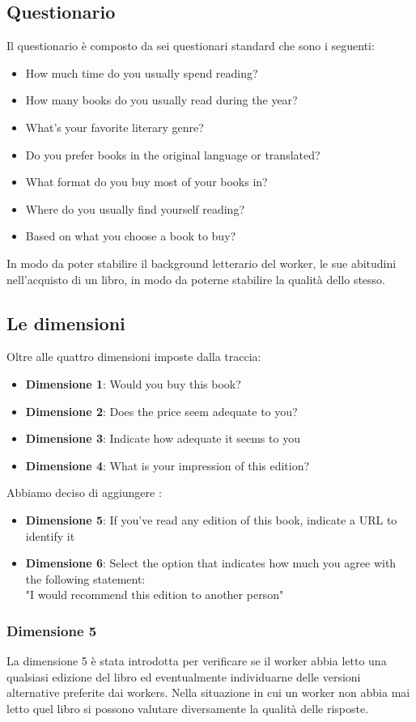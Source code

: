 \documentclass[a4paper,11pt]{report}
\begin{document}
\subsection{Questionario}
Il questionario è composto da sei questionari standard che sono i seguenti:
\begin{itemize}
	\item How much time do you usually spend reading?
	\item How many books do you usually read during the year?
	\item What's your favorite literary genre?
	\item Do you prefer books in the original language or translated?
	\item What format do you buy most of your books in?
	\item Where do you usually find yourself reading?
	\item Based on what you choose a book to buy?
\end{itemize}
In modo da poter stabilire il background letterario del worker, le sue abitudini nell'acquisto di un libro, in modo da poterne stabilire la qualità dello stesso.

\subsection{Le dimensioni}
Oltre alle quattro dimensioni imposte dalla traccia:
\begin{itemize}
	\item \textbf{Dimensione 1}: Would you buy this book?
	\item \textbf{Dimensione 2}: Does the price seem adequate to you?
	\item \textbf{Dimensione 3}: Indicate how adequate it seems to you
	\item \textbf{Dimensione 4}: What is your impression of this edition?
\end{itemize}
Abbiamo deciso di aggiungere :
\begin{itemize}
	\item \textbf{Dimensione 5}: If you've read any edition of this book, indicate a URL to identify it
	\item \textbf{Dimensione 6}: Select the option that indicates how much you agree with the following statement: \\ "I would recommend this edition to another person"
\end{itemize}
\subsubsection{Dimensione 5}
La dimensione 5 è stata introdotta per verificare se il worker abbia letto una qualsiasi edizione del libro ed eventualmente individuarne delle versioni alternative preferite dai workers. Nella situazione in cui un worker non abbia mai letto quel libro si possono valutare diversamente la qualità delle risposte.   
\end{document}
